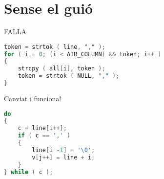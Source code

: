 \section{Sense el guió}

FALLA
\begin{lstlisting}[language=C]
token = strtok ( line, "," );
for ( i = 0; (i < AIR_COLUMN) && token; i++ )
{
	strcpy ( all[i], token );
	token = strtok ( NULL, "," );
}
\end{lstlisting}


Canviat i funciona!
\begin{lstlisting}[language=C]
do
{
	c = line[i++];
	if ( c == ',' )
	{
		line[i -1] = '\0';
		v[j++] = line + i;
	}
} while ( c );
\end{lstlisting}
